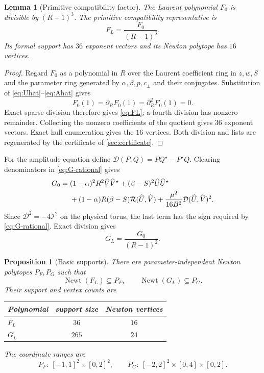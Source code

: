 \documentclass[11pt]{article}
\newtheorem{proposition}[theorem]{Proposition}
\newtheorem{lemma}[theorem]{Lemma}
\newcommand{\Newt}{\operatorname{Newt}}
\begin{document}
\begin{lemma}[Primitive compatibility factor]\label{lem:F-factor}
The Laurent polynomial $F_0$ is divisible by $(R-1)^3$.  The primitive compatibility representative is
\begin{equation}\label{eq:FL}
 F_L=\frac{F_0}{(R-1)^3}.
\end{equation}
Its formal support has $36$ exponent vectors and its Newton polytope has $16$ vertices.
\end{lemma}

\begin{proof}
Regard $F_0$ as a polynomial in $R$ over the Laurent coefficient ring in $z,w,S$ and the parameter ring generated by $\alpha,\beta,p,c_\pm$ and their conjugates.  Substitution of \eqref{eq:Uhat}--\eqref{eq:Ahat} gives
\[
 F_0(1)=\partial_R F_0(1)=\partial_R^2F_0(1)=0.
\]
Exact sparse division therefore gives \eqref{eq:FL}; a fourth division has nonzero remainder.  Collecting the nonzero coefficients of the quotient gives $36$ exponent vectors.  Exact hull enumeration gives the $16$ vertices.  Both division and lists are regenerated by the certificate of \cref{sec:certificate}.
\end{proof}

For the amplitude equation define $\mathcal D(P,Q)=PQ^\star-P^\star Q$.  Clearing denominators in \eqref{eq:G-rational} gives
\begin{align}
 G_0={}&(1-\alpha)^2R^2\widehat V\widehat V^\star
 +(\beta-S)^2\widehat U\widehat U^\star\notag\\
 &+(1-\alpha)R(\beta-S)\mathcal R(\widehat U,\widehat V)
 +\frac{\mu^2}{16B^2}\mathcal D(\widehat U,\widehat V)^2.\label{eq:G0}
\end{align}
Since $\mathcal D^2=-4\mathcal I^2$ on the physical torus, the last term has the sign required by \eqref{eq:G-rational}.  Exact division gives
\begin{equation}\label{eq:GL}
 G_L=\frac{G_0}{(R-1)^2}.
\end{equation}

\begin{proposition}[Basic supports]\label{prop:basic-supports}
There are parameter-independent Newton polytopes $P_F,P_G$ such that
\[
 \Newt(F_L)\subseteq P_F,
 \qquad
 \Newt(G_L)\subseteq P_G.
\]
Their support and vertex counts are
\begin{center}
\begin{tabular}{@{}lcc@{}}
\toprule
Polynomial & support size & Newton vertices\\
\midrule
$F_L$ & $36$ & $16$\\
$G_L$ & $265$ & $24$\\
\bottomrule
\end{tabular}
\end{center}
The coordinate ranges are
\[
 P_F:\ [-1,1]^2\times[0,2]^2,
 \qquad
 P_G:\ [-2,2]^2\times[0,4]\times[0,2].
\]
\end{proposition}
\end{document}
